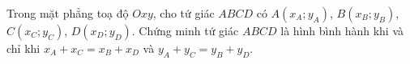 \begin{bt}%
	Trong mặt phẳng toạ độ $Oxy$, cho tứ giác $ABCD$ có $A(x_A;y_A)$, $B(x_B;y_B)$, $C(x_C;y_C)$, $D(x_D;y_D)$. Chứng minh tứ giác $ABCD$ là hình bình hành khi và chỉ khi $x_A+x_C=x_B+x_D$ và $y_A+y_C=y_B+y_D$.
\end{bt}
